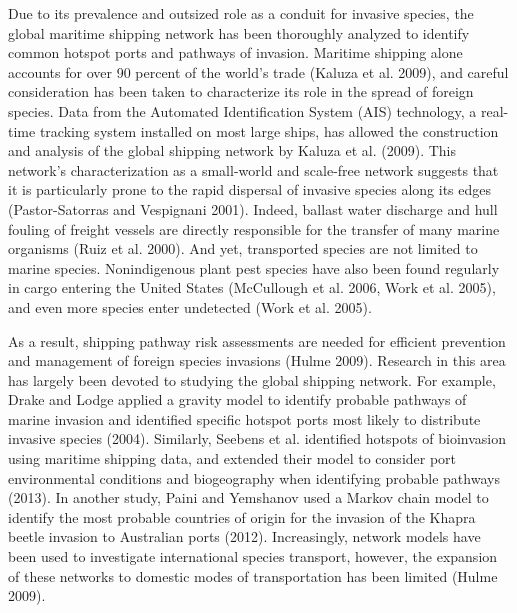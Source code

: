 \documentclass[12pt]{article}
\begin{document}
Due to its prevalence and outsized role as a conduit for invasive species, the global maritime shipping network has been thoroughly analyzed to identify common hotspot ports and pathways of invasion.  Maritime shipping alone accounts for over 90 percent of the world's trade (Kaluza et al. 2009), and careful consideration has been taken to characterize its role in the spread of foreign species.  Data from the Automated Identification System (AIS) technology, a real-time tracking system installed on most large ships, has allowed the construction and analysis of the global shipping network by Kaluza et al. (2009).  This network's characterization as a small-world and scale-free network suggests that it is particularly prone to the rapid dispersal of invasive species along its edges (Pastor-Satorras and Vespignani 2001).  Indeed, ballast water discharge and hull fouling of freight vessels are directly responsible for the transfer of many marine organisms (Ruiz et al. 2000).  And yet, transported species are not limited to marine species. Nonindigenous plant pest species have also been found regularly in cargo entering the United States (McCullough et al. 2006, Work et al. 2005), and even more species enter undetected (Work et al. 2005).

As a result, shipping pathway risk assessments are needed for efficient prevention and management of foreign species invasions (Hulme 2009).  Research in this area has largely been devoted to studying the global shipping network.  For example, Drake and Lodge applied a gravity model to identify probable pathways of marine invasion and identified specific hotspot ports most likely to distribute invasive species (2004).   Similarly, Seebens et al. identified hotspots of bioinvasion using maritime shipping data, and extended their model to consider port environmental conditions and biogeography when identifying probable pathways (2013).  In another study, Paini and Yemshanov used a Markov chain model to identify the most probable countries of origin for the invasion of the Khapra beetle invasion to Australian ports (2012).  Increasingly, network models have been used to investigate international species transport, however, the expansion of these networks to domestic modes of transportation has been limited (Hulme 2009).
\end{document}
